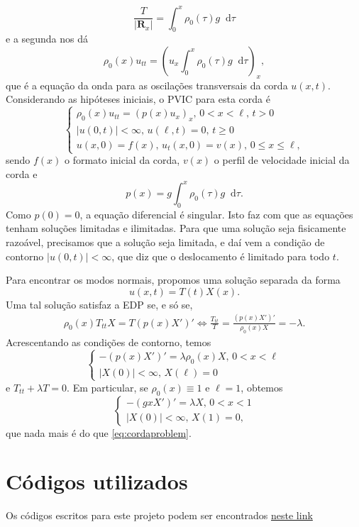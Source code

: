 \documentclass[twocolumn,showpacs,%
  nofootinbib,aps,superscriptaddress,%
  eqsecnum,prd,notitlepage,showkeys,10pt]{revtex4-1}
\newcommand*\diff{\mathop{}\!\mathrm{d}}
\renewcommand{\leq}{\leqslant}
\renewcommand{\geq}{\geqslant}
\begin{document}
%
\[
    \frac{T}{|\mathbf{R}_x|} = \int_0^x \rho_0(\tau) g \diff\tau
\]
%
e a segunda nos dá
%
\[
    \rho_0(x)u_{tt} = \left( u_x\int_0^x \rho_0(\tau) g \diff\tau \right)_x,
\]
%
que é a equação da onda para as oscilações transversais da corda $u(x,t)$.
Considerando as hipóteses iniciais, o PVIC para esta corda é
%
\[
    \left\{
        \begin{array}{l}
            \rho_0(x) u_{tt} = (p(x)u_x)_x, \, 0 < x < \ell, \, t > 0 \\ 
            |u(0,t)| < \infty, \, u(\ell, t) = 0, \, t\geq 0 \\ 
            u(x,0) = f(x), \, u_t(x,0) = v(x), \, 0 \leq x \leq \ell,
        \end{array}
    \right.
\]
%
sendo $f(x)$ o formato inicial da corda, $v(x)$ o perfil de velocidade inicial da corda
e
%
\[
    p(x) = g\int_0^x \rho_0(\tau) g \diff\tau.
\]
%
Como $p(0) = 0$, a equação diferencial é singular. Isto faz com que as equações
tenham soluções limitadas e ilimitadas. Para que uma solução seja fisicamente
razoável, precisamos que a solução seja limitada, e daí vem a condição de contorno
$|u(0,t)| < \infty$, que diz que o deslocamento é limitado para todo $t$.

Para encontrar os modos normais, propomos uma solução separada da forma
%
\[
    u(x,t) = T(t)X(x).
\]
%
Uma tal solução satisfaz a EDP se, e só se,
%
\begin{align*}
    \rho_0(x)T_{tt}X = T(p(x)X')' \iff
    \frac{T_{tt}}{T} = \frac{(p(x) X')'}{\rho_0(x) X} = -\lambda.
\end{align*}
%
Acrescentando as condições de contorno, temos
%
\[
    \left\{
        \begin{array}{l}
            -(p(x)X')' = \lambda\rho_0(x)X, \, 0 < x < \ell \\ 
            |X(0)| < \infty, \, X(\ell) = 0
        \end{array}
    \right.
\]
%
e $T_{tt} + \lambda T = 0$. Em particular, se $\rho_0(x) \equiv 1$ e $\ell = 1$, obtemos
%
\[
    \left\{
        \begin{array}{l}
            -(gxX')' = \lambda X, \, 0 < x < 1 \\ 
            |X(0)| < \infty, \, X(1) = 0,
        \end{array}
    \right.
\]
%
que nada mais é do que \eqref{eq:cordaproblem}.

%
\section{Códigos utilizados}
%
Os códigos escritos para este projeto podem ser encontrados \href{}{neste link}
\end{document}
